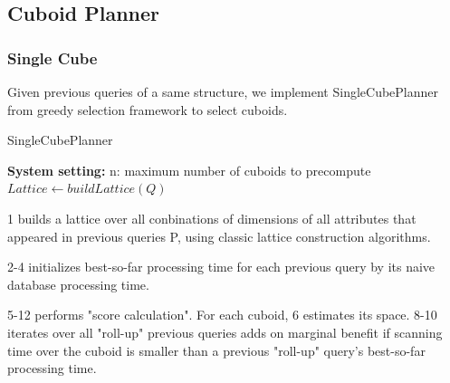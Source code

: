 \subsection{Cuboid Planner}

\subsubsection{Single Cube}

Given previous queries of a same structure, we implement  SingleCubePlanner from greedy selection framework to select cuboids. 

\begin{algorithm}[H]
	\caption{SingleCubePlanner}
	\LinesNumbered 
	\textbf{System setting:} n: maximum number of cuboids to precompute\\ 
	$Lattice \leftarrow buildLattice(Q)$\;
	
\end{algorithm}
\clearpage

1 builds a lattice over all conbinations of dimensions of all attributes that appeared in previous queries P, using classic lattice construction algorithms.

2-4 initializes best-so-far processing time for each previous query by its naive database processing time.

5-12 performs "score calculation". For each cuboid, 6 estimates its space. 8-10 iterates over all "roll-up" previous queries adds on marginal benefit if scanning time over the cuboid is smaller than a previous "roll-up" query's best-so-far processing time.

